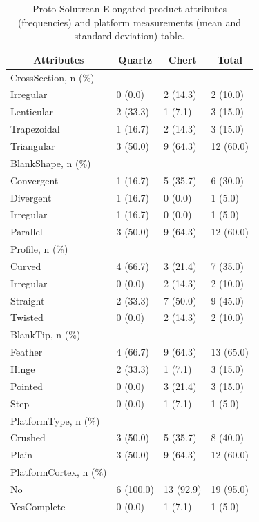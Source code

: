 \documentclass[12pt,twoside]{reedthesis}
\begin{document}
\begin{longtable}[t]{llll}
\caption{\label{tab:unnamed-chunk-78}Proto-Solutrean Elongated product attributes (frequencies) and platform measurements (mean and standard deviation) table.}\\
\toprule
\multicolumn{1}{c}{\textbf{Attributes}} & \multicolumn{1}{c}{\textbf{Quartz}} & \multicolumn{1}{c}{\textbf{Chert}} & \multicolumn{1}{c}{\textbf{Total}}\\
\midrule
CrossSection, n (\%) &  &  & \\
Irregular & 0 (0.0) & 2 (14.3) & 2 \vphantom{1} (10.0)\\
Lenticular & 2 (33.3) & 1 (7.1) & 3 (15.0)\\
Trapezoidal & 1 (16.7) & 2 (14.3) & 3 (15.0)\\
Triangular & 3 (50.0) & 9 (64.3) & 12 (60.0)\\
\addlinespace
BlankShape, n (\%) &  &  & \\
Convergent & 1 (16.7) & 5 (35.7) & 6 (30.0)\\
Divergent & 1 (16.7) & 0 (0.0) & 1 (5.0)\\
Irregular & 1 (16.7) & 0 (0.0) & 1 (5.0)\\
Parallel & 3 (50.0) & 9 (64.3) & 12 (60.0)\\
\addlinespace
Profile, n (\%) &  &  & \\
Curved & 4 (66.7) & 3 (21.4) & 7 (35.0)\\
Irregular & 0 (0.0) & 2 (14.3) & 2 (10.0)\\
Straight & 2 (33.3) & 7 (50.0) & 9 (45.0)\\
Twisted & 0 (0.0) & 2 (14.3) & 2 (10.0)\\
\addlinespace
BlankTip, n (\%) &  &  & \\
Feather & 4 (66.7) & 9 (64.3) & 13 (65.0)\\
Hinge & 2 (33.3) & 1 (7.1) & 3 (15.0)\\
Pointed & 0 (0.0) & 3 (21.4) & 3 (15.0)\\
Step & 0 (0.0) & 1 (7.1) & 1 (5.0)\\
\addlinespace
PlatformType, n (\%) &  &  & \\
Crushed & 3 (50.0) & 5 (35.7) & 8 (40.0)\\
Plain & 3 (50.0) & 9 (64.3) & 12 (60.0)\\
PlatformCortex, n (\%) &  &  & \\
No & 6 (100.0) & 13 (92.9) & 19 (95.0)\\
\addlinespace
YesComplete & 0 (0.0) & 1 (7.1) & 1 (5.0)\\

\end{longtable}
\end{document}
